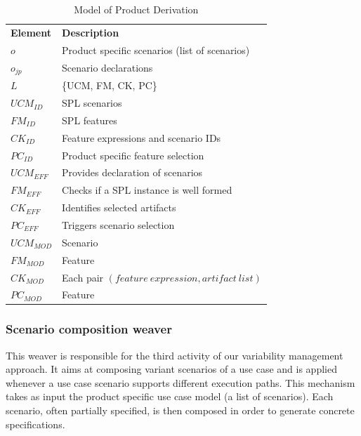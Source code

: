 \documentclass{acm_proc_article-sp}
\begin{document}
\begin{table}[bh]
\begin{center}
\caption{Model of Product Derivation} \label{tab:pd-weaver}
\begin{tabular}{p{0.6in}p{2.4in}}
   \hline\noalign{\smallskip}
  {\bf Element} & {\bf Description} \\
   \noalign{\smallskip}
   \hline
   \noalign{\smallskip}
   $o$               & Product specific scenarios (list of scenarios) \\ 
   $o_{jp}$        & Scenario declarations \\ 
   $L$               & \{UCM, FM, CK, PC\} \\ 
   $UCM_{ID}$ & SPL scenarios \\ 
   $FM_{ID}$    & SPL features \\ 
   $CK_{ID}$    & Feature expressions and scenario IDs\\  
   $PC_{ID}$    & Product specific feature selection \\ 
   $UCM_{EFF}$ & Provides declaration of scenarios \\  
   $FM_{EFF}$    & Checks if a SPL instance is well formed \\ 
   $CK_{EFF}$    & Identifies selected artifacts  \\ 
   $PC_{EFF}$    &Triggers scenario selection \\
   $UCM_{MOD}$ & Scenario \\  
   $FM_{MOD}$   & Feature \\ 
   $CK_{MOD}$    & Each pair $(feature\ expression, artifact\ list)$  \\ 
   $PC_{MOD}$    & Feature \\
  \hline
  \end{tabular}
\end{center}
\end{table}



\subsubsection{Scenario composition weaver}\label{sub:sc-weaver}

This weaver is responsible for the third activity of our variability management 
approach. It aims at composing variant scenarios of a use case and is applied whenever a use case scenario supports different execution paths.
This mechanism takes as input the product specific use case model (a list of scenarios). Each scenario, often partially specified, is then composed in order to generate concrete specifications.
\end{document}
